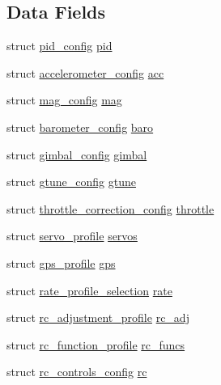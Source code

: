 \subsection*{Data Fields}
\begin{DoxyCompactItemize}
\item 
struct \hyperlink{structpid__config}{pid\+\_\+config} \hyperlink{structconfig__profile_aed102519582975e36138dcd8b2b3be1a}{pid}
\item 
struct \hyperlink{structaccelerometer__config}{accelerometer\+\_\+config} \hyperlink{structconfig__profile_ad62236bbaf62a6059204c64bae21e79b}{acc}
\item 
struct \hyperlink{structmag__config}{mag\+\_\+config} \hyperlink{structconfig__profile_ade4b97078c9e4f0c546d407659fc881c}{mag}
\item 
struct \hyperlink{structbarometer__config}{barometer\+\_\+config} \hyperlink{structconfig__profile_a1d5ba292d5e9d3cda5017c87cefc9371}{baro}
\item 
struct \hyperlink{structgimbal__config}{gimbal\+\_\+config} \hyperlink{structconfig__profile_a1f93f192a762277a14f8b009f6578703}{gimbal}
\item 
struct \hyperlink{structgtune__config}{gtune\+\_\+config} \hyperlink{structconfig__profile_aaf5e741ea89faecbada743f2166e819f}{gtune}
\item 
struct \hyperlink{structthrottle__correction__config}{throttle\+\_\+correction\+\_\+config} \hyperlink{structconfig__profile_a36d1e9f52f01cf6ce3ad5805449e487b}{throttle}
\item 
struct \hyperlink{structservo__profile}{servo\+\_\+profile} \hyperlink{structconfig__profile_a6e23e383ad0d15bba87c80f90f64ff76}{servos}
\item 
struct \hyperlink{structgps__profile}{gps\+\_\+profile} \hyperlink{structconfig__profile_a8eb78c3f11b2c30d907908ba7a2b722e}{gps}
\item 
struct \hyperlink{structrate__profile__selection}{rate\+\_\+profile\+\_\+selection} \hyperlink{structconfig__profile_a3cd92c84b4f601536028dd41d1b8e5c5}{rate}
\item 
struct \hyperlink{structrc__adjustment__profile}{rc\+\_\+adjustment\+\_\+profile} \hyperlink{structconfig__profile_aa67ec5ef75e8604f4bd63529ba8964e0}{rc\+\_\+adj}
\item 
struct \hyperlink{structrc__function__profile}{rc\+\_\+function\+\_\+profile} \hyperlink{structconfig__profile_ad1ec96d23173b9a5fe492dde314e512c}{rc\+\_\+funcs}
\item 
struct \hyperlink{structrc__controls__config}{rc\+\_\+controls\+\_\+config} \hyperlink{structconfig__profile_a1c1b9ed298777bf616d1021a9b467ea4}{rc}
\end{DoxyCompactItemize}


